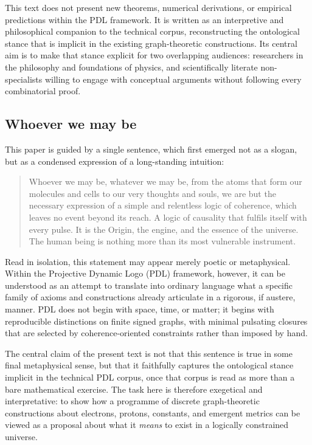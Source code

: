 \documentclass[11pt,a4paper]{article}
\theoremstyle{definition}
\begin{document}
This text does not present new theorems, numerical derivations, or empirical
predictions within the PDL framework. It is written as an interpretive and
philosophical companion to the technical corpus, reconstructing the ontological
stance that is implicit in the existing graph-theoretic constructions. Its
central aim is to make that stance explicit for two overlapping audiences:
researchers in the philosophy and foundations of physics, and scientifically
literate non-specialists willing to engage with conceptual arguments without
following every combinatorial proof.

\subsection{Whoever we may be}

This paper is guided by a single sentence, which first emerged not as a slogan, but as a condensed expression of a long-standing intuition:

\begin{quote}
Whoever we may be, whatever we may be, from the atoms that form our molecules and cells to our very thoughts and souls, we are but the necessary expression of a simple and relentless logic of coherence, which leaves no event beyond its reach. A logic of causality that fulfils itself with every pulse. It is the Origin, the engine, and the essence of the universe. The human being is nothing more than its most vulnerable instrument.
\end{quote}

Read in isolation, this statement may appear merely poetic or metaphysical. Within the Projective Dynamic Logo (PDL) framework, however, it can be understood as an attempt to translate into ordinary language what a specific family of axioms and constructions already articulate in a rigorous, if austere, manner.\cite{Laubscher_IntroPDL_2024,Laubscher_EmergencePhysicalReality_2024,Laubscher_PDL_Position_2024} PDL does not begin with space, time, or matter; it begins with reproducible distinctions on finite signed graphs, with minimal pulsating closures that are selected by coherence-oriented constraints rather than imposed by hand.

The central claim of the present text is not that this sentence is true in some final metaphysical sense, but that it faithfully captures the ontological stance implicit in the technical PDL corpus, once that corpus is read as more than a bare mathematical exercise. The task here is therefore exegetical and interpretative: to show how a programme of discrete graph-theoretic constructions about electrons, protons, constants, and emergent metrics can be viewed as a proposal about what it \emph{means} to exist in a logically constrained universe.\cite{Laubscher_Existence_PulsatingClosure_2026,Laubscher_PDL_GlobalMapping_v6_2024}
\end{document}
